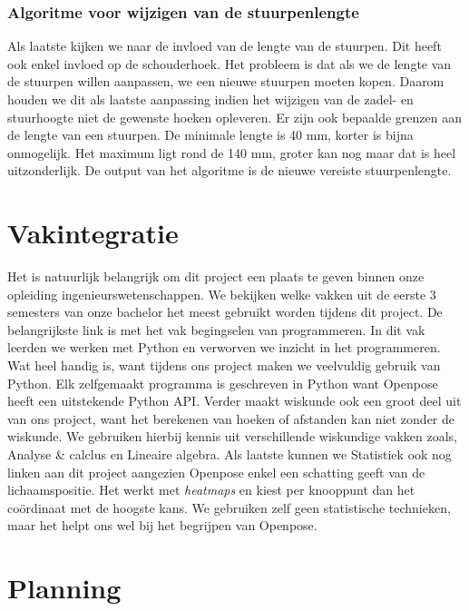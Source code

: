 \documentclass[a4paper,twoside,kulak]{kulakreport}
\begin{document}
\subsection{Algoritme voor wijzigen van de stuurpenlengte}

Als laatste kijken we naar de invloed van de lengte van de stuurpen. Dit heeft ook enkel invloed op de schouderhoek. Het probleem is dat als we de lengte van de stuurpen willen aanpassen, we een nieuwe stuurpen moeten kopen. Daarom houden we dit als laatste aanpassing indien het wijzigen van de zadel- en stuurhoogte niet de gewenste hoeken opleveren. Er zijn ook bepaalde grenzen aan de lengte van een stuurpen. De minimale lengte is 40 \si{mm}, korter is bijna onmogelijk. Het maximum ligt rond de 140 \si{mm}, groter kan nog maar dat is heel uitzonderlijk. De output van het algoritme is de nieuwe vereiste stuurpenlengte.

\chapter{Vakintegratie}
Het is natuurlijk belangrijk om dit project een plaats te geven binnen onze opleiding ingenieurswetenschappen. We bekijken welke vakken uit de eerste 3 semesters van onze bachelor het meest gebruikt worden tijdens dit project. De belangrijkste link is met het vak begingselen van programmeren. In dit vak leerden we werken met Python en verworven we inzicht in het programmeren. Wat heel handig is, want tijdens ons project maken we veelvuldig gebruik van Python. Elk zelfgemaakt programma is geschreven in Python want Openpose heeft een uitstekende Python API. Verder maakt wiskunde ook een groot deel uit van ons project, want het berekenen van hoeken of afstanden kan niet zonder de wiskunde. We gebruiken hierbij kennis uit verschillende wiskundige vakken zoals, Analyse \& calclus en Lineaire algebra. Als laatste kunnen we Statistiek ook nog linken aan dit project aangezien Openpose enkel een schatting geeft van de lichaamspositie. Het werkt met \textit{heatmaps} en kiest per knooppunt dan het coördinaat met de hoogste kans. We gebruiken zelf geen statistische technieken, maar het helpt ons wel bij het begrijpen van Openpose.

\chapter{Planning}
\end{document}
